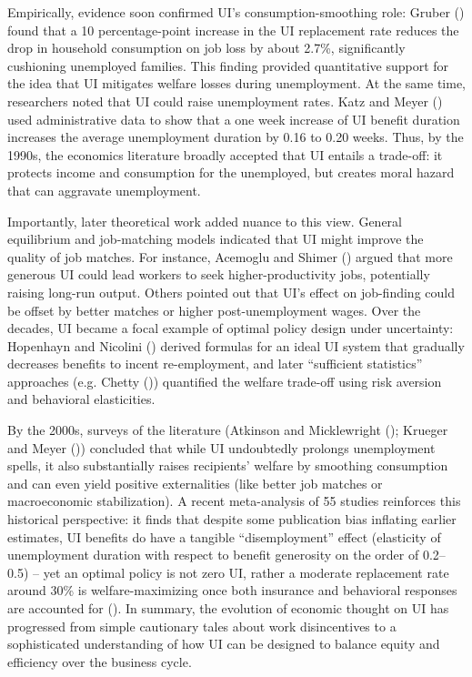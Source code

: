 \documentclass[
  4pt,
]{report}
\begin{document}
Empirically, evidence soon confirmed UI's consumption-smoothing role:
Gruber () found that a 10
percentage-point increase in the UI replacement rate reduces the drop in
household consumption on job loss by about 2.7\%, significantly
cushioning unemployed families. This finding provided quantitative
support for the idea that UI mitigates welfare losses during
unemployment. At the same time, researchers noted that UI could raise
unemployment rates. Katz and Meyer () used
administrative data to show that a one week increase of UI benefit
duration increases the average unemployment duration by 0.16 to 0.20
weeks. Thus, by the 1990s, the economics literature broadly accepted
that UI entails a trade-off: it protects income and consumption for the
unemployed, but creates moral hazard that can aggravate unemployment.

Importantly, later theoretical work added nuance to this view. General
equilibrium and job-matching models indicated that UI might improve the
quality of job matches. For instance, Acemoglu and Shimer
() argued that more generous UI could
lead workers to seek higher-productivity jobs, potentially raising
long-run output. Others pointed out that UI's effect on job-finding
could be offset by better matches or higher post-unemployment wages.
Over the decades, UI became a focal example of optimal policy design
under uncertainty: Hopenhayn and Nicolini
() derived formulas for an ideal UI
system that gradually decreases benefits to incent re-employment, and
later ``sufficient statistics'' approaches (e.g. Chetty
()) quantified the welfare trade-off
using risk aversion and behavioral elasticities.

By the 2000s, surveys of the literature (Atkinson and Micklewright
(); Krueger and Meyer
()) concluded that while UI undoubtedly
prolongs unemployment spells, it also substantially raises recipients'
welfare by smoothing consumption and can even yield positive
externalities (like better job matches or macroeconomic stabilization).
A recent meta-analysis of 55 studies reinforces this historical
perspective: it finds that despite some publication bias inflating
earlier estimates, UI benefits do have a tangible ``disemployment''
effect (elasticity of unemployment duration with respect to benefit
generosity on the order of 0.2--0.5) -- yet an optimal policy is not
zero UI, rather a moderate replacement rate around 30\% is
welfare-maximizing once both insurance and behavioral responses are
accounted for (). In
summary, the evolution of economic thought on UI has progressed from
simple cautionary tales about work disincentives to a sophisticated
understanding of how UI can be designed to balance equity and efficiency
over the business cycle.
\end{document}
